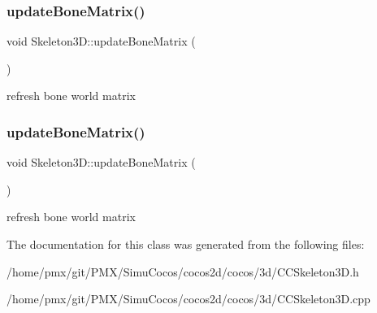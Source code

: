 \subsubsection{\texorpdfstring{update\+Bone\+Matrix()}{updateBoneMatrix()}\hspace{0.1cm}{\footnotesize\ttfamily [1/2]}}
{\footnotesize\ttfamily void Skeleton3\+D\+::update\+Bone\+Matrix (\begin{DoxyParamCaption}{ }\end{DoxyParamCaption})}

refresh bone world matrix \mbox{\label{classSkeleton3D_aaf4bd03372f7be1293cc4d62406127a2}} 
\subsubsection{\texorpdfstring{update\+Bone\+Matrix()}{updateBoneMatrix()}\hspace{0.1cm}{\footnotesize\ttfamily [2/2]}}
{\footnotesize\ttfamily void Skeleton3\+D\+::update\+Bone\+Matrix (\begin{DoxyParamCaption}{ }\end{DoxyParamCaption})}

refresh bone world matrix 

The documentation for this class was generated from the following files\+:\begin{DoxyCompactItemize}
\item 
/home/pmx/git/\+P\+M\+X/\+Simu\+Cocos/cocos2d/cocos/3d/C\+C\+Skeleton3\+D.\+h\item 
/home/pmx/git/\+P\+M\+X/\+Simu\+Cocos/cocos2d/cocos/3d/C\+C\+Skeleton3\+D.\+cpp\end{DoxyCompactItemize}
